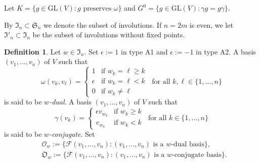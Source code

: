 \documentclass{amsart}
\theoremstyle{definition}
\newtheorem{definition}{Definition}
\begin{document}
Let $K=\{g\in\mathrm{GL}(V):\mbox{$g$ preserves $\omega$}\}$
and $G^0=\{g\in\mathrm{GL}(V):\gamma g=g\gamma\}$.

By $\mathfrak{I}_n\subset\mathfrak{S}_n$ we denote the
subset of involutions.
If $n=2m$ is even, we let $\mathfrak{I}'_n\subset\mathfrak{I}_n$
be the subset of involutions without fixed points.

\begin{definition}
\label{DA12}
Let $w\in\mathfrak{I}_n$. Set $\epsilon:=1$ in type A1 and
$\epsilon:=-1$ in type A2. A basis $(v_1,\ldots,v_n)$ of $V$ such that
\[\omega(v_k,v_\ell)=\left\{\begin{array}{ll} 1 & \mbox{if $w_k=\ell\geq k$} \\ \epsilon & \mbox{if $w_k=\ell< k$} \\ 0 & \mbox{if $w_k\not=\ell$} \end{array}\right.
\ \mbox{ for all $k,\ell\in\{1,\ldots,n\}$}\] is said to be {\em
$w$-dual}. A basis $(v_1,\ldots,v_n)$ of $V$ such that
\[
\gamma(v_k)=\left\{\begin{array}{ll} \epsilon v_{w_k} & \mbox{if $w_k\geq k$}
\\ v_{w_k} & \mbox{if $w_k< k$}
\end{array}\right.
\ \mbox{ for all $k\in\{1,\ldots,n\}$}
\]
is said to be {\em $w$-conjugate}. Set
\begin{eqnarray*}
 & \mathcal{O}_w:=\{\mathcal{F}(v_1,\ldots,v_n):\mbox{$(v_1,\ldots,v_n)$ is a $w$-dual basis}\}, \\[1mm]
 & \mathfrak{O}_w:=\{\mathcal{F}(v_1,\ldots,v_n):\mbox{$(v_1,\ldots,v_n)$ is a $w$-conjugate basis}\}.
\end{eqnarray*}
\end{definition}

\end{document}

